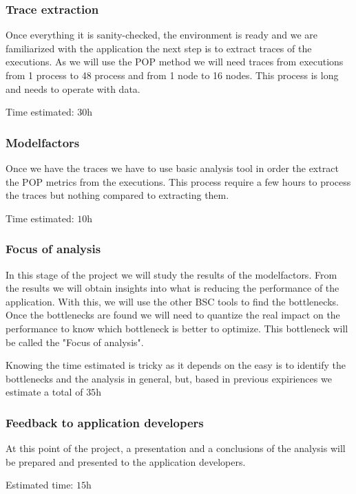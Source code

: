 \subsubsection{Trace extraction}
\justify
Once everything it is sanity-checked, the environment is ready and we are familiarized with the application the next step is to extract traces of the executions. As we will use the POP method we will need traces from executions from 1 process to 48 process and from 1 node to 16 nodes. This process is long and needs to operate with data.

\justify
Time estimated: $\si{30\hour}$

\subsubsection{Modelfactors}
\justify
Once we have the traces we have to use basic analysis tool in order the extract the POP metrics from the executions. This process require a few hours to process the traces but nothing compared to extracting them.

\justify
Time estimated: $\si{10\hour}$

\subsubsection{Focus of analysis}
\justify
In this stage of the project we will study the results of the modelfactors. From the results we will obtain insights into what is reducing the performance of the application. With this, we will use the other BSC tools to find the bottlenecks. Once the bottlenecks are found we will need to quantize the real impact on the performance to know which bottleneck is better to optimize. This bottleneck will be called the "Focus of analysis".

\justify
Knowing the time estimated is tricky as it depends on the easy is to identify the bottlenecks and the analysis in general, but, based in previous expiriences we estimate a total of $\si{35\hour}$

\subsubsection{Feedback to application developers}
\justify
At this point of the project, a presentation and a conclusions of the analysis will be prepared and presented to the application developers.

\justify
Estimated time: $\si{15\hour}$

